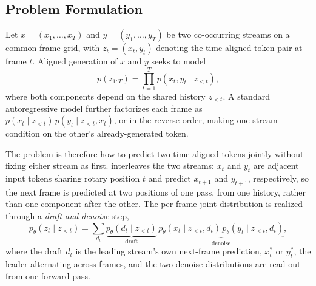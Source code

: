 
\subsection{Problem Formulation}
\label{sec:formulation}

Let $x=(x_1,\ldots,x_T)$ and $y=(y_1,\ldots,y_T)$ be two co-occurring
streams on a common frame grid, with $z_t=(x_t,y_t)$ denoting the
time-aligned token pair at frame $t$. Aligned generation of $x$ and $y$
seeks to model
\begin{equation}
    p(z_{1:T})
    =
    \prod_{t=1}^{T} p(x_t,y_t \mid z_{<t}),
    \label{eq:joint_ar}
\end{equation}
where both components depend on the shared history $z_{<t}$. A standard
autoregressive model further factorizes each frame as
$p(x_t \mid z_{<t})\,p(y_t \mid z_{<t},x_t)$, or in the reverse order,
making one stream condition on the other's already-generated token.

The problem is therefore how to predict two time-aligned tokens jointly
without fixing either stream as first. \sys interleaves the two
streams: $x_t$ and $y_t$ are adjacent input tokens sharing rotary
position $t$ and predict $x_{t+1}$ and $y_{t+1}$, respectively, so the
next frame is predicted at two positions of one pass, from one history,
rather than one component after the other. The per-frame joint
distribution is realized through a \emph{draft-and-denoise} step,
\begin{equation}
p_\theta(z_t \mid z_{<t})
=
\sum_{d_t}
\underbrace{p_\theta(d_t \mid z_{<t})}_{\text{draft}}\,
\underbrace{p_\theta(x_t \mid z_{<t},d_t)\,p_\theta(y_t \mid z_{<t},d_t)}_{\text{denoise}},
\label{eq:draft_denoise}
\end{equation}
where the draft $d_t$ is the leading stream's own next-frame prediction,
$x^*_t$ or $y^*_t$, the leader alternating across frames, and the two
denoise distributions are read out from one forward pass.

